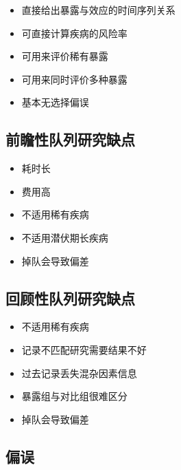 \documentclass[]{book}
\providecommand{\tightlist}{%
  \setlength{\itemsep}{0pt}\setlength{\parskip}{0pt}}
\begin{document}
\begin{itemize}
\tightlist
\item
  直接给出暴露与效应的时间序列关系
\item
  可直接计算疾病的风险率
\item
  可用来评价稀有暴露
\item
  可用来同时评价多种暴露
\item
  基本无选择偏误
\end{itemize}

\hypertarget{ux524dux77bbux6027ux961fux5217ux7814ux7a76ux7f3aux70b9}{%
\subsection{前瞻性队列研究缺点}\label{ux524dux77bbux6027ux961fux5217ux7814ux7a76ux7f3aux70b9}}

\begin{itemize}
\tightlist
\item
  耗时长
\item
  费用高
\item
  不适用稀有疾病
\item
  不适用潜伏期长疾病
\item
  掉队会导致偏差
\end{itemize}

\hypertarget{ux56deux987eux6027ux961fux5217ux7814ux7a76ux7f3aux70b9}{%
\subsection{回顾性队列研究缺点}\label{ux56deux987eux6027ux961fux5217ux7814ux7a76ux7f3aux70b9}}

\begin{itemize}
\tightlist
\item
  不适用稀有疾病
\item
  记录不匹配研究需要结果不好
\item
  过去记录丢失混杂因素信息
\item
  暴露组与对比组很难区分
\item
  掉队会导致偏差
\end{itemize}

\hypertarget{ux504fux8bef}{%
\subsection{偏误}\label{ux504fux8bef}}
\end{document}
